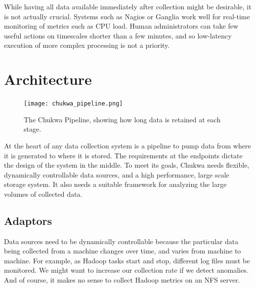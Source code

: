 \documentclass[letterpaper,twocolumn,10pt]{article}
\begin{document}
While having all data available immediately after collection might be desirable, it is not actually crucial. Systems such as Nagios or Ganglia work well for real-time monitoring of metrics such as CPU load.   Human administrators can take few useful actions on timescales shorter than a few minutes, and so low-latency execution of more complex processing is not a priority.


\section{Architecture}

\begin{figure}
 \texttt{[image: chukwa\_pipeline.png]}
\caption{The Chukwa Pipeline, showing how long data is retained at each stage.} 
\end{figure}

At the heart of any data collection system is a pipeline to pump data from where it is generated to where it is stored. The requirements at the endpoints dictate the design of the system in the middle. To meet its goals, Chukwa needs flexible, dynamically controllable data sources, and a high performance, large scale storage system. %
 It also needs a suitable framework for analyzing the large volumes of collected data.

\subsection{Adaptors}

Data sources need to be dynamically controllable because the particular data being collected from a machine changes over time, and varies from machine to machine. For example, as Hadoop tasks start and stop, different log files must be monitored. We might want to increase our collection rate if we detect anomalies.  And of course, it makes no sense to collect Hadoop metrics on an NFS server. 
\end{document}
